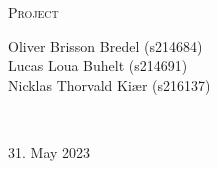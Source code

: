 \begin{titlepage}
\textsc{\Large Project}\\[1cm]


\begin{minipage}{0.5\textwidth}
        \begin{flushleft}
            \centering
            \large
            
            Oliver Brisson Bredel (s214684) \\[0.2cm]
            Lucas Loua Buhelt (s214691) \\[0.2cm]
            Nicklas Thorvald Kiær (s216137) \\[0.2cm]
        \end{flushleft}
\end{minipage}
\\[1cm]
\vfill \vfill

{\large 31. May 2023}

\vfill

\end{titlepage}